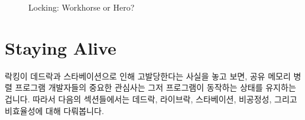 \begin{figure}[tb]
\centering
{}
\caption{Locking: Workhorse or Hero?}
\end{figure}

\section{Staying Alive}
\label{sec:locking:Staying Alive}

락킹이 데드락과 스타베이션으로 인해 고발당한다는 사실을 놓고 보면, 공유 메모리
병렬 프로그램 개발자들의 중요한 관심사는 그저 프로그램이 동작하는 상태를
유지하는 겁니다.
따라서 다음의 섹션들에서는 데드락, 라이브락, 스타베이션, 비공정성, 그리고
비효율성에 대해 다뤄봅니다.

